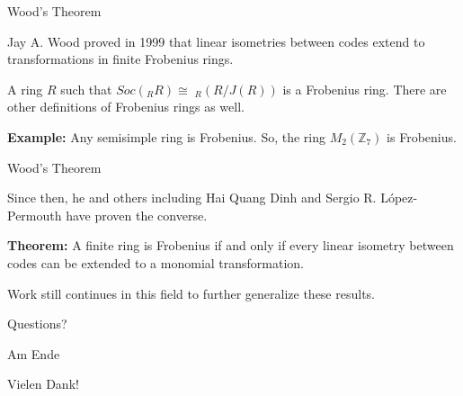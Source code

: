 \documentclass{beamer}
\begin{document}
\begin{frame}{Wood's Theorem}
    
    Jay A. Wood proved in 1999 that linear isometries between codes extend to transformations in
    finite Frobenius rings.

    \bigskip

    A ring $R$ such that $Soc(_RR)\cong\;_R(R/J(R))$ is a Frobenius ring. There are other definitions
    of Frobenius rings as well.

    \bigskip

    \pause

    \textbf{Example:} Any semisimple ring is Frobenius. So, the ring $M_2(\mathbb{Z}_7)$ is Frobenius.

\end{frame}

\begin{frame}{Wood's Theorem}
    
    Since then, he and others including Hai Quang Dinh and Sergio R. L\'{o}pez-Permouth have proven
    the converse.

    \bigskip

    \pause

    \textbf{Theorem:} A finite ring is Frobenius if and only if every linear isometry between codes can
    be extended to a monomial transformation.

    \bigskip

    \pause

    Work still continues in this field to further generalize these results.

\end{frame}

\begin{frame}

    \begin{center}
        Questions?
    \end{center}

\end{frame}

\begin{frame}{Am Ende}

    \begin{center}
        Vielen Dank!
    \end{center}

\end{frame}
\end{document}
